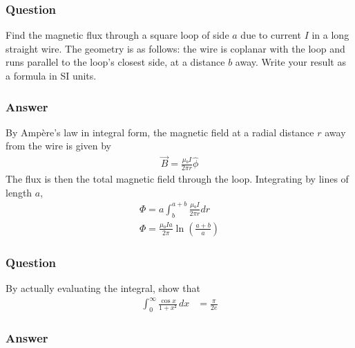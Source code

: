 \subsubsection{Question}

Find the magnetic flux through a square loop of side $a$ due to current $I$ in
a long straight wire. The geometry is as follows: the wire is coplanar with the
loop and runs parallel to the loop's closest side, at a distance $b$ away.
Write your result as a formula in SI units.

\subsubsection{Answer}

By Ampère's law in integral form, the magnetic field at a radial distance $r$
away from the wire is given by
\begin{align*}
    \vec B = \frac{μ₀I}{2πr} \hat ϕ
\end{align*}
The flux is then the total magnetic field through the loop. Integrating by
lines of length $a$,
\begin{align*}
    Φ = a \int_b^{a+b} \frac{μ₀I}{2πr} dr \\
    \boxed{Φ = \frac{μ₀Ia}{2π}\ln(\frac{a+b}{a})}
\end{align*}

\subsubsection{Question}

By actually evaluating the integral, show that
\begin{align*}
    \int_0^∞ \frac{\cos x}{1 + x²}\,dx &= \frac{π}{2e}
\end{align*}

\subsubsection{Answer}

